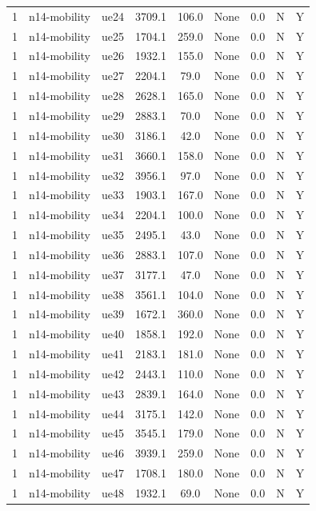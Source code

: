 \begin{table}[ht]
\begin{tabular}{|c|c|c|c|c|c|c|c|c|}
1 & n14-mobility & ue24 & 3709.1 & 106.0 & None & 0.0 & N & Y \\
1 & n14-mobility & ue25 & 1704.1 & 259.0 & None & 0.0 & N & Y \\
1 & n14-mobility & ue26 & 1932.1 & 155.0 & None & 0.0 & N & Y \\
1 & n14-mobility & ue27 & 2204.1 & 79.0 & None & 0.0 & N & Y \\
1 & n14-mobility & ue28 & 2628.1 & 165.0 & None & 0.0 & N & Y \\
1 & n14-mobility & ue29 & 2883.1 & 70.0 & None & 0.0 & N & Y \\
1 & n14-mobility & ue30 & 3186.1 & 42.0 & None & 0.0 & N & Y \\
1 & n14-mobility & ue31 & 3660.1 & 158.0 & None & 0.0 & N & Y \\
1 & n14-mobility & ue32 & 3956.1 & 97.0 & None & 0.0 & N & Y \\
1 & n14-mobility & ue33 & 1903.1 & 167.0 & None & 0.0 & N & Y \\
1 & n14-mobility & ue34 & 2204.1 & 100.0 & None & 0.0 & N & Y \\
1 & n14-mobility & ue35 & 2495.1 & 43.0 & None & 0.0 & N & Y \\
1 & n14-mobility & ue36 & 2883.1 & 107.0 & None & 0.0 & N & Y \\
1 & n14-mobility & ue37 & 3177.1 & 47.0 & None & 0.0 & N & Y \\
1 & n14-mobility & ue38 & 3561.1 & 104.0 & None & 0.0 & N & Y \\
1 & n14-mobility & ue39 & 1672.1 & 360.0 & None & 0.0 & N & Y \\
1 & n14-mobility & ue40 & 1858.1 & 192.0 & None & 0.0 & N & Y \\
1 & n14-mobility & ue41 & 2183.1 & 181.0 & None & 0.0 & N & Y \\
1 & n14-mobility & ue42 & 2443.1 & 110.0 & None & 0.0 & N & Y \\
1 & n14-mobility & ue43 & 2839.1 & 164.0 & None & 0.0 & N & Y \\
1 & n14-mobility & ue44 & 3175.1 & 142.0 & None & 0.0 & N & Y \\
1 & n14-mobility & ue45 & 3545.1 & 179.0 & None & 0.0 & N & Y \\
1 & n14-mobility & ue46 & 3939.1 & 259.0 & None & 0.0 & N & Y \\
1 & n14-mobility & ue47 & 1708.1 & 180.0 & None & 0.0 & N & Y \\
1 & n14-mobility & ue48 & 1932.1 & 69.0 & None & 0.0 & N & Y \\

\end{tabular}
\end{table}
